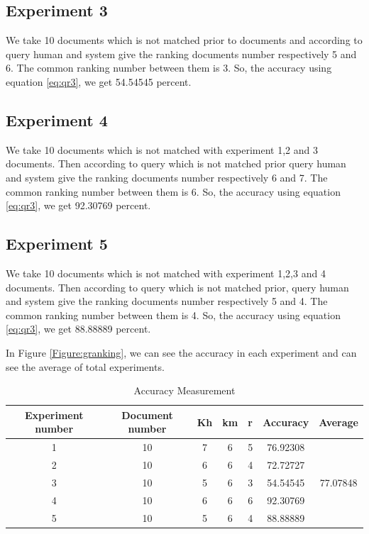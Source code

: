 \subsection{Experiment 3}

We take 10 documents which is not matched prior to documents and according to query human and system give the ranking documents number respectively 5 and 6. The common ranking number between them is 3. So, the accuracy using equation \ref{eq:qr3}, we get 54.54545 percent.

\subsection{Experiment 4}

We take 10 documents which is not matched with experiment 1,2 and 3 documents. Then according to query which is not matched prior query human and system give the ranking documents number respectively 6 and 7. The common ranking number between them is 6. So, the accuracy using equation \ref{eq:qr3}, we get 92.30769 percent.

\subsection{Experiment 5}

We take 10 documents which is not matched with experiment 1,2,3 and 4 documents. Then according to query which is not matched prior, query human and system give the ranking documents number respectively 5 and 4. The common ranking number between them is 4. So, the accuracy using equation \ref{eq:qr3}, we get 88.88889 percent.

In Figure \ref{Figure:granking}, we can see the accuracy in each experiment and can see the average of total experiments.

\begin{table}[htp]	
\centering

\caption{Accuracy Measurement }
\vspace{0.5cm}
\begin{tabular}{|c|c|c|c|c|c|c|} 
\hline

	Experiment number & Document number & Kh & km & r & Accuracy & Average \\ \hline
 1 & 10 & 7 & 6 & 5 & 76.92308 &   \\ \hline
 2 & 10 & 6 & 6 & 4 & 72.72727 &   \\ \hline
 3 & 10 & 5 & 6 & 3 & 54.54545 & 77.07848  \\ \hline
 4 & 10 & 6 & 6 & 6 & 92.30769 &   \\ \hline
 5 & 10 & 5 & 6 & 4 & 88.88889 &   \\ \hline


\end{tabular}
\label{tab:Accuracy}
\end{table}


